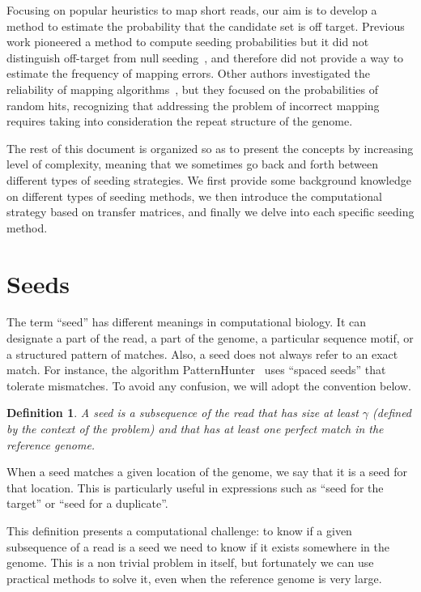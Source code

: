 \documentclass{article}
\newtheorem{definition}{Definition}
\begin{document}
Focusing on popular heuristics to map short reads, our aim is to develop a
method to estimate the probability that the candidate set is off target.
Previous work pioneered a method to compute seeding probabilities but it
did not distinguish off-target from null
seeding~\cite{filion2017analytic,filion2018analytic}, and therefore did
not provide a way to estimate the frequency of mapping errors. Other
authors investigated the reliability of mapping
algorithms~\cite{pmid23872968}, but they focused on the probabilities of
random hits, recognizing that addressing the problem of incorrect mapping
requires taking into consideration the repeat structure of the genome.

The rest of this document is organized so as to present the concepts by
increasing level of complexity, meaning that we sometimes go back and
forth between different types of seeding strategies. We first provide some
background knowledge on different types of seeding methods, we then
introduce the computational strategy based on transfer matrices, and
finally we delve into each specific seeding method.

\section{Seeds}

The term ``seed'' has different meanings in computational biology. It can
designate a part of the read, a part of the genome, a particular sequence
motif, or a structured pattern of matches. Also, a seed does not always
refer to an exact match. For instance, the algorithm
PatternHunter~\cite{pmid11934743} uses ``spaced seeds'' that tolerate
mismatches. To avoid any confusion, we will adopt the convention below.

\begin{definition}
A seed is a subsequence of the read that has size at least $\gamma$
(defined by the context of the problem) and that has at least one perfect
match in the reference genome.
\end{definition}

When a seed matches a given location of the genome, we say that it is a
seed for that location. This is particularly useful in expressions such as
``seed for the target'' or ``seed for a duplicate''.

This definition presents a computational challenge: to know if a given
subsequence of a read is a seed we need to know if it exists somewhere in
the genome. This is a non trivial problem in itself, but fortunately we
can use practical methods to solve it, even when the reference genome is
very large.
\end{document}
